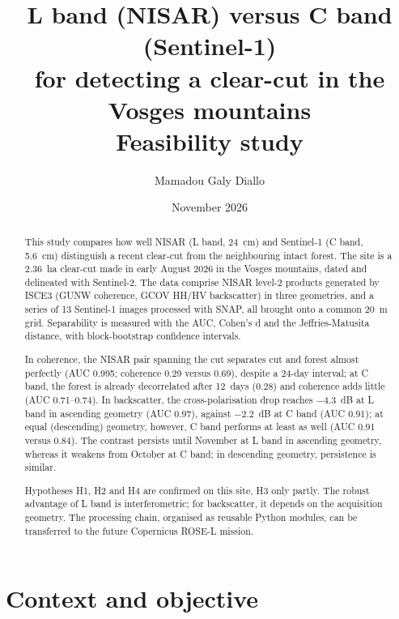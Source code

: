 \documentclass[11pt,a4paper]{article}
\title{L band (NISAR) versus C band (Sentinel-1)\\for detecting a clear-cut in the Vosges mountains\\[0.4em]
\large Feasibility study}
\author{Mamadou Galy Diallo}
\date{November 2026}
\begin{document}
\maketitle

\begin{abstract}
\noindent
This study compares how well NISAR (L band, 24~cm) and Sentinel-1 (C band, 5.6~cm) distinguish a recent clear-cut
from the neighbouring intact forest. The site is a 2.36~ha clear-cut made in early August 2026 in the Vosges
mountains, dated and delineated with Sentinel-2. The data comprise NISAR level-2 products generated by ISCE3 (GUNW
coherence, GCOV HH/HV backscatter) in three geometries, and a series of 13 Sentinel-1 images processed with SNAP,
all brought onto a common 20~m grid. Separability is measured with the AUC, Cohen's d and the Jeffries-Matusita
distance, with block-bootstrap confidence intervals.

In coherence, the NISAR pair spanning the cut separates cut and forest almost perfectly (AUC 0.995; coherence 0.29
versus 0.69), despite a 24-day interval; at C band, the forest is already decorrelated after 12~days (0.28) and
coherence adds little (AUC 0.71--0.74). In backscatter, the cross-polarisation drop reaches $-4.3$~dB at L band in
ascending geometry (AUC 0.97), against $-2.2$~dB at C band (AUC 0.91); at equal (descending) geometry, however,
C band performs at least as well (AUC 0.91 versus 0.84). The contrast persists until November at L band in
ascending geometry, whereas it weakens from October at C band; in descending geometry, persistence is similar.

Hypotheses H1, H2 and H4 are confirmed on this site, H3 only partly. The robust advantage of L band is
interferometric; for backscatter, it depends on the acquisition geometry. The processing chain, organised as
reusable Python modules, can be transferred to the future Copernicus ROSE-L mission.
\end{abstract}

\tableofcontents
\newpage

\section{Context and objective}
\end{document}

